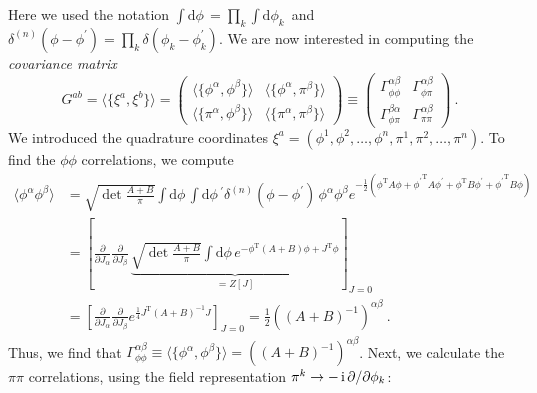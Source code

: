 \documentclass[letter]{article}
\renewcommand{\i}{\,\ensuremath\mathrm{i\,}}
\newcommand{\intd}[1]{\int\mathrm{d}#1\,}
\begin{document}
Here we used the notation $\intd\phi = \prod_k \intd{\phi_k}$ and $\delta^{(n)}(\phi - \phi^\prime) = \prod_k \delta(\phi_k - \phi_k^\prime)$. We are now interested in computing the \emph{covariance matrix}
\begin{equation}
G^{a b} = \langle \{ \xi^a, \xi^b \} \rangle =
\begin{pmatrix}
\langle \{ \phi^\alpha, \phi^\beta \} \rangle & \langle \{ \phi^\alpha, \pi^\beta \} \rangle \\
\langle \{ \pi^\alpha, \phi^\beta \} \rangle & \langle \{ \pi^\alpha, \pi^\beta \} \rangle
\end{pmatrix}
\equiv
\begin{pmatrix}
\Gamma^{\alpha\beta}_{\phi\phi} & \Gamma^{\alpha\beta}_{\phi\pi} \\
\Gamma^{\beta\alpha}_{\phi\pi} & \Gamma^{\alpha\beta}_{\pi\pi}
\end{pmatrix}\ .
\end{equation}
We introduced the quadrature coordinates $\xi^a = (\phi^1, \phi^2,\dots,\phi^n,\pi^1,\pi^2,\dots,\pi^n)$. To find the $\phi\phi$ correlations, we compute
\begin{align}
\langle \phi^\alpha \phi^\beta \rangle &= \sqrt{\det\frac{A+B}{\pi}} \intd\phi \intd\phi^\prime  \delta^{(n)}(\phi - \phi^\prime)\, \phi^\alpha \phi^\beta e^{ -\frac{1}{2} (\phi^\mathrm{T} A \phi + {\phi^\prime}^\mathrm{T} A \phi^\prime + \phi^\mathrm{T} B \phi^\prime + {\phi^\prime}^\mathrm{T} B \phi ) } \nonumber\\
&= \left[ \frac{\partial}{\partial J_\alpha} \frac{\partial}{\partial J_\beta}\, 
\underbrace{\sqrt{\det\frac{A+B}{\pi}} \intd\phi  e^{ -\phi^\mathrm{T} (A+B) \phi + J^\mathrm{T} \phi }}_{= Z[J]} \right]_{J=0} \nonumber\\
&= \left[ \frac{\partial}{\partial J_\alpha} \frac{\partial}{\partial J_\beta} e^{\frac{1}{4} J^\mathrm{T} (A+B)^{-1} J} \right]_{J=0}  = \frac{1}{2} ((A+B)^{-1})^{\alpha\beta}\ .
\end{align}
Thus, we find that $\Gamma^{\alpha\beta}_{\phi\phi} \equiv \langle \{ \phi^\alpha, \phi^\beta \} \rangle = ((A+B)^{-1})^{\alpha\beta}$. Next, we calculate the $\pi\pi$ correlations, using the field representation $\pi^k \to - \i \partial/\partial\phi_k$:
\end{document}

